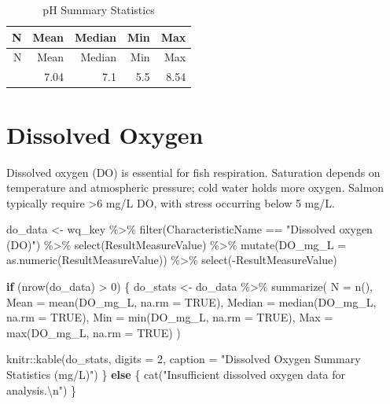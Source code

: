 \documentclass[
  letterpaper,
]{scrbook}
\newenvironment{Shaded}{\begin{snugshade}}{\end{snugshade}}
\newcommand{\AttributeTok}[1]{\textcolor[rgb]{0.40,0.45,0.13}{#1}}
\newcommand{\ConstantTok}[1]{\textcolor[rgb]{0.56,0.35,0.01}{#1}}
\newcommand{\ControlFlowTok}[1]{\textcolor[rgb]{0.00,0.23,0.31}{\textbf{#1}}}
\newcommand{\DecValTok}[1]{\textcolor[rgb]{0.68,0.00,0.00}{#1}}
\newcommand{\FunctionTok}[1]{\textcolor[rgb]{0.28,0.35,0.67}{#1}}
\newcommand{\NormalTok}[1]{\textcolor[rgb]{0.00,0.23,0.31}{#1}}
\newcommand{\OtherTok}[1]{\textcolor[rgb]{0.00,0.23,0.31}{#1}}
\newcommand{\SpecialCharTok}[1]{\textcolor[rgb]{0.37,0.37,0.37}{#1}}
\newcommand{\StringTok}[1]{\textcolor[rgb]{0.13,0.47,0.30}{#1}}
\begin{document}
\begin{longtable}[]{@{}rrrrr@{}}
\caption{pH Summary Statistics}\tabularnewline
\toprule\noalign{}
N & Mean & Median & Min & Max \\
\midrule\noalign{}
\endfirsthead
\toprule\noalign{}
N & Mean & Median & Min & Max \\
\midrule\noalign{}
\endhead
\bottomrule\noalign{}
\endlastfoot
446 & 7.04 & 7.1 & 5.5 & 8.54 \\
\end{longtable}

\section{Dissolved Oxygen}\label{dissolved-oxygen}

Dissolved oxygen (DO) is essential for fish respiration. Saturation
depends on temperature and atmospheric pressure; cold water holds more
oxygen. Salmon typically require \textgreater6 mg/L DO, with stress
occurring below 5 mg/L.

\begin{Shaded}
\begin{Highlighting}[]
\NormalTok{do\_data }\OtherTok{\textless{}{-}}\NormalTok{ wq\_key }\SpecialCharTok{\%\textgreater{}\%}
  \FunctionTok{filter}\NormalTok{(CharacteristicName }\SpecialCharTok{==} \StringTok{"Dissolved oxygen (DO)"}\NormalTok{) }\SpecialCharTok{\%\textgreater{}\%}
  \FunctionTok{select}\NormalTok{(ResultMeasureValue) }\SpecialCharTok{\%\textgreater{}\%}
  \FunctionTok{mutate}\NormalTok{(}\AttributeTok{DO\_mg\_L =} \FunctionTok{as.numeric}\NormalTok{(ResultMeasureValue)) }\SpecialCharTok{\%\textgreater{}\%}
  \FunctionTok{select}\NormalTok{(}\SpecialCharTok{{-}}\NormalTok{ResultMeasureValue)}

\ControlFlowTok{if}\NormalTok{ (}\FunctionTok{nrow}\NormalTok{(do\_data) }\SpecialCharTok{\textgreater{}} \DecValTok{0}\NormalTok{) \{}
\NormalTok{  do\_stats }\OtherTok{\textless{}{-}}\NormalTok{ do\_data }\SpecialCharTok{\%\textgreater{}\%}
    \FunctionTok{summarize}\NormalTok{(}
      \AttributeTok{N =} \FunctionTok{n}\NormalTok{(),}
      \AttributeTok{Mean =} \FunctionTok{mean}\NormalTok{(DO\_mg\_L, }\AttributeTok{na.rm =} \ConstantTok{TRUE}\NormalTok{),}
      \AttributeTok{Median =} \FunctionTok{median}\NormalTok{(DO\_mg\_L, }\AttributeTok{na.rm =} \ConstantTok{TRUE}\NormalTok{),}
      \AttributeTok{Min =} \FunctionTok{min}\NormalTok{(DO\_mg\_L, }\AttributeTok{na.rm =} \ConstantTok{TRUE}\NormalTok{),}
      \AttributeTok{Max =} \FunctionTok{max}\NormalTok{(DO\_mg\_L, }\AttributeTok{na.rm =} \ConstantTok{TRUE}\NormalTok{)}
\NormalTok{    )}
  
\NormalTok{  knitr}\SpecialCharTok{::}\FunctionTok{kable}\NormalTok{(do\_stats, }\AttributeTok{digits =} \DecValTok{2}\NormalTok{, }\AttributeTok{caption =} \StringTok{"Dissolved Oxygen Summary Statistics (mg/L)"}\NormalTok{)}
\NormalTok{\} }\ControlFlowTok{else}\NormalTok{ \{}
  \FunctionTok{cat}\NormalTok{(}\StringTok{"Insufficient dissolved oxygen data for analysis.}\SpecialCharTok{\textbackslash{}n}\StringTok{"}\NormalTok{)}
\NormalTok{\}}
\end{Highlighting}
\end{Shaded}
\end{document}
